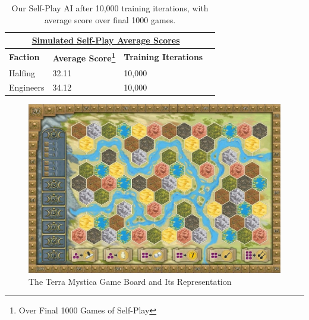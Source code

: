 \documentclass[12pt,twocolumn,letterpaper]{article}
\begin{document}
\begin{table}[h!]
\begin{tabular}{|l|l|l|l|}
\hline
\multicolumn{3}{|c|}{{\ul \textbf{Simulated Self-Play Average Scores}}}      \\ \hline
\textbf{Faction} & \textbf{Average Score\footnote{Over Final 1000 Games of Self-Play}} & \textbf{Training Iterations} \\ \hline
Halfing          & 32.11                 & 10,000                   \\ \hline
Engineers        & 34.12                 & 10,000                 \\ \hline
\end{tabular}
\caption{Our Self-Play AI after 10,000 training iterations, with average score over final 1000 games.}
\label{table:average_2p_score_our_ai}
\end{table}


\begin{figure}[h!]
    \centering
    \includegraphics[scale=0.2]{../figures/tm_board}
    \caption{The Terra Mystica Game Board and Its Representation}
    \label{fig:TM_Board}
\end{figure}
\end{document}
